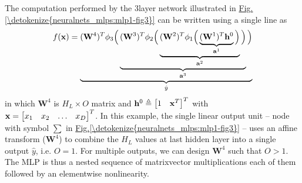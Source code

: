 \documentclass[letterpaper,10pt,english]{jupyterBook}
\begin{document}
\sphinxAtStartPar
The computation performed by the 3\sphinxhyphen{}layer network illustrated in \hyperref[\detokenize{neuralnets_mlps:mlp1-fig3}]{Fig.\@ \ref{\detokenize{neuralnets_mlps:mlp1-fig3}}} can be written using a single line as \begin{equation*}
\begin{split} f({\bf x}) = \underbrace{({\bf W}^{4})^{T}
\phi_3 \Big(
\underbrace{({\bf W}^{3})^{T} \phi_2 \Big(
\underbrace{({\bf W}^{2})^{T} 
\phi_1 \Big(
\underbrace{({\bf W}^{1})^{T} {\bf h}^{0}}_{\mathbf{a}^{1}} 
\Big)}_{\mathbf{a}^{2}} \Big)}_{\mathbf{a}^{3}} \Big)}_{\hat{y}} \end{split}
\end{equation*} in which \( \mathbf{W}^{4} \) is \(H_L \times O\) matrix and \( {\bf h}^{0} \triangleq \begin{bmatrix} 1 & {\bf x}^{T} \end{bmatrix}^{T} \) with \( {\bf x} = \begin{bmatrix} x_1 & x_2 & \ldots & x_D \end{bmatrix}^{T} \). In this example, the single linear output unit – node with symbol \( \sum \) in \hyperref[\detokenize{neuralnets_mlps:mlp1-fig3}]{Fig.\@ \ref{\detokenize{neuralnets_mlps:mlp1-fig3}}} – uses an affine transform (\( \mathbf{W}^{4} \)) to combine the \(H_L\) values at last hidden layer into a single output \( \hat{y} \), i.e. \(O=1\). For multiple outputs, we can design \( \mathbf{W}^{4} \) such that \(O > 1\). The MLP is thus a nested sequence of matrix\sphinxhyphen{}vector multiplications each of them followed by an element\sphinxhyphen{}wise non\sphinxhyphen{}linearity.
\label{neuralnets_mlps:definition-0}
\end{document}
